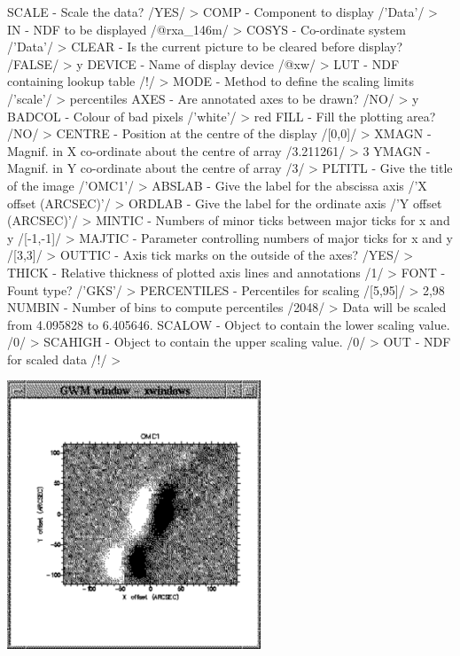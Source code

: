 \documentclass[11pt,noabs]{starlink}
\begin{document}
\begin{terminalv}
SCALE - Scale the data? /YES/ >
COMP - Component to display /'Data'/ >
IN - NDF to be displayed /@rxa_146m/ >
COSYS - Co-ordinate system /'Data'/ >
CLEAR - Is the current picture to be cleared before display? /FALSE/ > y
DEVICE - Name of display device /@xw/ >
LUT - NDF containing lookup table /!/ >
MODE - Method to define the scaling limits /'scale'/ > percentiles
AXES - Are annotated axes to be drawn? /NO/ > y
BADCOL - Colour of bad pixels /'white'/ > red
FILL - Fill the plotting area? /NO/ >
CENTRE - Position at the centre of the display /[0,0]/ >
XMAGN - Magnif. in X co-ordinate about the centre of array /3.211261/ > 3
YMAGN - Magnif. in Y co-ordinate about the centre of array /3/ >
PLTITL - Give the title of the image /'OMC1'/ >
ABSLAB - Give the label for the abscissa axis /'X offset (ARCSEC)'/ >
ORDLAB - Give the label for the ordinate axis /'Y offset (ARCSEC)'/ >
MINTIC - Numbers of minor ticks between major ticks for x and y /[-1,-1]/ >
MAJTIC - Parameter controlling numbers of major ticks for x and y /[3,3]/ >
OUTTIC - Axis tick marks on the outside of the axes? /YES/ >
THICK - Relative thickness of plotted axis lines and annotations /1/ >
FONT - Fount type? /'GKS'/ >
PERCENTILES - Percentiles for scaling /[5,95]/ > 2,98
NUMBIN - Number of bins to compute percentiles /2048/ >
Data will be scaled from 4.095828 to 6.405646.
SCALOW - Object to contain the lower scaling value. /0/ >
SCAHIGH - Object to contain the upper scaling value. /0/ >
OUT - NDF for scaled data /!/ >
\end{terminalv}

\begin{center}
\leavevmode\includegraphics[height=80mm]{sc1_display2}
\end{center}
\end{document}
